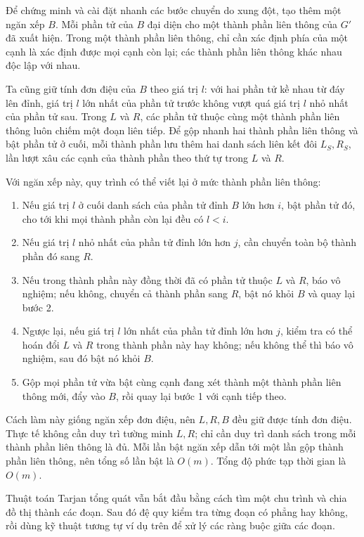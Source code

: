 \documentclass[11pt]{article}
\begin{document}
Để chứng minh và cài đặt nhanh các bước chuyển do xung đột, tạo thêm một ngăn
xếp $B$. Mỗi phần tử của $B$ đại diện cho một thành phần liên thông của $G'$ đã
xuất hiện. Trong một thành phần liên thông, chỉ cần xác định phía của một cạnh
là xác định được mọi cạnh còn lại; các thành phần liên thông khác nhau độc lập
với nhau.

Ta cũng giữ tính đơn điệu của $B$ theo giá trị $l$: với hai phần tử kề nhau từ
đáy lên đỉnh, giá trị $l$ lớn nhất của phần tử trước không vượt quá giá trị
$l$ nhỏ nhất của phần tử sau. Trong $L$ và $R$, các phần tử thuộc cùng một thành
phần liên thông luôn chiếm một đoạn liên tiếp. Để gộp nhanh hai thành phần liên
thông và bật phần tử ở cuối, mỗi thành phần lưu thêm hai danh sách liên kết đôi
$L_S,R_S$, lần lượt xâu các cạnh của thành phần theo thứ tự trong $L$ và $R$.

Với ngăn xếp này, quy trình có thể viết lại ở mức thành phần liên thông:
\begin{enumerate}
  \item Nếu giá trị $l$ ở cuối danh sách của phần tử đỉnh $B$ lớn hơn $i$, bật
  phần tử đó, cho tới khi mọi thành phần còn lại đều có $l<i$.
  \item Nếu giá trị $l$ nhỏ nhất của phần tử đỉnh lớn hơn $j$, cần chuyển toàn
  bộ thành phần đó sang $R$.
  \item Nếu trong thành phần này đồng thời đã có phần tử thuộc $L$ và $R$, báo
  vô nghiệm; nếu không, chuyển cả thành phần sang $R$, bật nó khỏi $B$ và quay
  lại bước 2.
  \item Ngược lại, nếu giá trị $l$ lớn nhất của phần tử đỉnh lớn hơn $j$, kiểm
  tra có thể hoán đổi $L$ và $R$ trong thành phần này hay không; nếu không thể
  thì báo vô nghiệm, sau đó bật nó khỏi $B$.
  \item Gộp mọi phần tử vừa bật cùng cạnh đang xét thành một thành phần liên
  thông mới, đẩy vào $B$, rồi quay lại bước 1 với cạnh tiếp theo.
\end{enumerate}

Cách làm này giống ngăn xếp đơn điệu, nên $L,R,B$ đều giữ được tính đơn điệu.
Thực tế không cần duy trì tường minh $L,R$; chỉ cần duy trì danh sách trong mỗi
thành phần liên thông là đủ. Mỗi lần bật ngăn xếp dẫn tới một lần gộp thành
phần liên thông, nên tổng số lần bật là $O(m)$. Tổng độ phức tạp thời gian là
$O(m)$.

Thuật toán Tarjan tổng quát vẫn bắt đầu bằng cách tìm một chu trình và chia đồ
thị thành các đoạn. Sau đó đệ quy kiểm tra từng đoạn có phẳng hay không, rồi
dùng kỹ thuật tương tự ví dụ trên để xử lý các ràng buộc giữa các đoạn.
\end{document}
